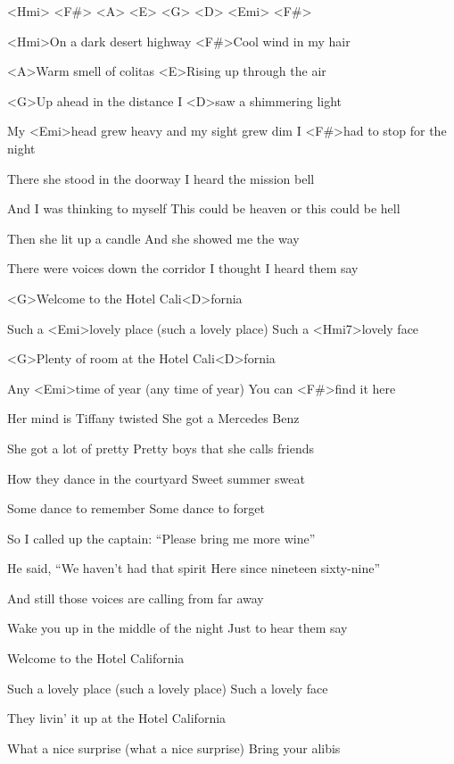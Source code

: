 

<Hmi> <F#> <A> <E> <G> <D> <Emi> <F#>

\zs
<Hmi>On a dark desert highway
<F#>Cool wind in my hair

<A>Warm smell of colitas
<E>Rising up through the air

<G>Up ahead in the distance
I <D>saw a shimmering light

My <Emi>head grew heavy and my sight grew dim
I <F#>had to stop for the night
\ks

\zs
There she stood in the doorway
I heard the mission bell

And I was thinking to myself
This could be heaven or this could be hell

Then she lit up a candle
And she showed me the way

There were voices down the corridor
I thought I heard them say
\ks

\zr
<G>Welcome to the Hotel Cali<D>fornia

Such a <Emi>lovely place (such a lovely place)
Such a <Hmi7>lovely face

<G>Plenty of room at the Hotel Cali<D>fornia

Any <Emi>time of year (any time of year)
You can <F#>find it here
\kr

\zs
Her mind is Tiffany twisted
She got a Mercedes Benz

She got a lot of pretty
Pretty boys that she calls friends

How they dance in the courtyard
Sweet summer sweat

Some dance to remember
Some dance to forget
\ks

\zs
So I called up the captain:
``Please bring me more wine''

He said, ``We haven't had that spirit
Here since nineteen sixty-nine''

And still those voices are calling from far away

Wake you up in the middle of the night
Just to hear them say
\ks

\zr
Welcome to the Hotel California

Such a lovely place (such a lovely place)
Such a lovely face

They livin' it up at the Hotel California

What a nice surprise (what a nice surprise)
Bring your alibis
\kr

